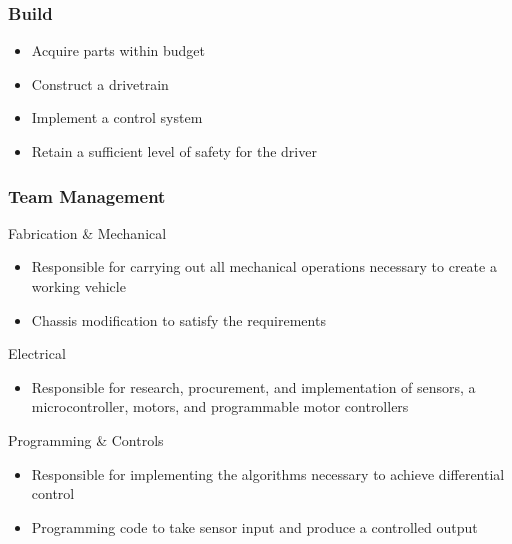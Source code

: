 \documentclass{beamer}
\begin{document}
\begin{frame}
	\frametitle{Build}
		\begin{itemize}
			\item Acquire parts within budget
			\item Construct a drivetrain
			\item Implement a control system
			\item Retain a sufficient level of safety for the driver
		\end{itemize}
\end{frame}
\begin{frame}
	\frametitle{Team Management}
		\begin{block}{Fabrication \& Mechanical}
			\begin{itemize}
				\item Responsible for carrying out all mechanical operations necessary to create a working vehicle
				\item Chassis modification to satisfy the requirements
			\end{itemize}
		\end{block}
		\begin{block}{Electrical}
			\begin{itemize}
				\item Responsible for research, procurement, and implementation of sensors, a microcontroller, motors, and programmable motor controllers
			\end{itemize}
		\end{block}
		\begin{block}{Programming \& Controls}
			\begin{itemize}
			\item Responsible for implementing the algorithms necessary to achieve 		differential control
			\item Programming code to take sensor input and produce a controlled output
			\end{itemize}
		\end{block}
\end{frame}
\end{document}
